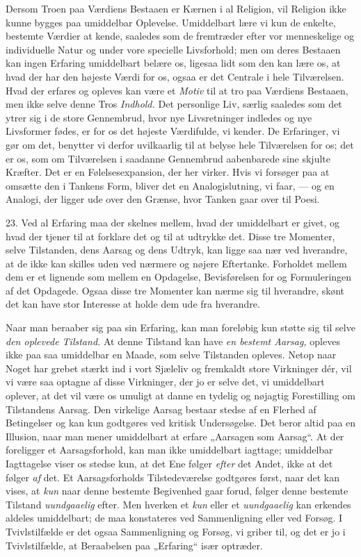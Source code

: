 \documentclass[12pt,a4paper,openany]{book}
\newcommand{\opage}[1]{\marginnote{\footnotesize\textit{[#1]}}}
\begin{document}
Dersom Troen paa Værdiens Bestaaen er Kærnen i al Religion, vil Religion
ikke kunne bygges paa umiddelbar Oplevelse. Umiddelbart lære vi kun de
enkelte, bestemte Værdier at kende, saaledes som de fremtræder efter vor
menneskelige og individuelle Natur og under vore specielle Livsforhold;
men om deres Bestaaen kan ingen Erfaring umiddelbart belære os, ligesaa
lidt som den kan lære os, at hvad der har den højeste Værdi for os,
ogsaa er det Centrale i hele Tilværelsen. Hvad der erfares og opleves
kan være et \textit{Motiv} til at tro paa Værdiens Bestaaen, men ikke
selve denne Tros \textit{Indhold.} Det personlige Liv, særlig saaledes
som det ytrer sig i de store Gennembrud, hvor nye Livsretninger indledes
og nye Livsformer fødes, er for os det højeste Værdifulde, vi kender. De
Erfaringer, vi gør om det, benytter vi derfor uvilkaarlig til at belyse
hele Tilværelsen for os; det er os, som om Tilværelsen i saadanne
Gennembrud aabenbarede sine skjulte Kræfter. Det er en
Følelsesexpansion, der her virker. Hvis vi forsøger paa at omsætte den i
Tankens Form, bliver det en Analogislutning, vi faar, --- og en Analogi,
der ligger ude over den Grænse, hvor Tanken gaar over til Poesi.

23. Ved al Erfaring maa der skelnes mellem, hvad der umiddelbart er
givet, og hvad der tjener til at forklare det og til at udtrykke det.
Disse tre Momenter, selve Tilstanden, dens Aarsag og dens Udtryk, kan
ligge saa nær ved hverandre, at de ikke kan skilles uden ved nærmere og
nøjere Eftertanke. Forholdet
\opage{57}mellem dem er et lignende som mellem en Opdagelse,
Bevisførelsen for og Formuleringen af det Opdagede. Ogsaa disse tre
Momenter kan nærme sig til hverandre, skønt det kan have stor Interesse
at holde dem ude fra hverandre.

Naar man beraaber sig paa sin Erfaring, kan man foreløbig kun støtte sig
til selve \textit{den oplevede Tilstand.} At denne Tilstand kan have
\textit{en bestemt Aarsag,} opleves ikke paa saa umiddelbar en Maade,
som selve Tilstanden opleves. Netop naar Noget har grebet stærkt ind i
vort Sjæleliv og fremkaldt store Virkninger dér, vil vi være saa optagne
af disse Virkninger, der jo er selve det, vi umiddelbart oplever, at det
vil være os umuligt at danne en tydelig og nøjagtig Forestilling om
Tilstandens Aarsag. Den virkelige Aarsag bestaar stedse af en Flerhed af
Betingelser og kan kun godtgøres ved kritisk Undersøgelse. Det beror
altid paa en Illusion, naar man mener umiddelbart at erfare „Aarsagen
som Aarsag“. At der foreligger et Aarsagsforhold, kan man ikke
umiddelbart iagttage; umiddelbar Iagttagelse viser os stedse kun, at det
Ene følger \textit{efter} det Andet, ikke at det følger \textit{af} det.
Et Aarsagsforholds Tilstedeværelse godtgøres først, naar det kan vises,
at \textit{kun} naar denne bestemte Begivenhed gaar forud, følger denne
bestemte Tilstand \textit{uundgaaelig} efter. Men hverken et
\textit{kun} eller et \textit{uundgaaelig} kan erkendes aldeles
umiddelbart; de maa konstateres ved Sammenligning eller ved Forsøg. I
Tvivlstilfælde er det ogsaa Sammenligning og Forsøg, vi griber til, og
det er jo i Tvivlstilfælde, at Beraabelsen paa „Erfaring“ især optræder.
\end{document}
